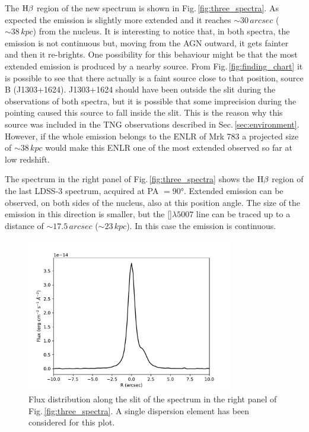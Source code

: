 \documentclass[../main.tex]{subfiles}
\begin{document}
The $\rm H\beta$ region of the new spectrum is shown in Fig.\,\ref{fig:three_spectra}.
As expected the emission is slightly more extended and it reaches $\sim 30\,\si{arcsec}$ ($\sim 38\,\si{kpc}$) from the nucleus.
It is interesting to notice that, in both spectra, the emission is not continuous but, moving from the AGN outward, it gets fainter and then it re-brights.
One possibility for this behaviour might be that the most extended emission is produced by a nearby source.
From Fig.\,\ref{fig:finding_chart} it is possible to see that there actually is a faint source close to that position, source B (J1303+1624).
J1303+1624 should have been outside the slit during the observations of both spectra, but it is possible that some imprecision during the pointing caused this source to fall inside the slit.
This is the reason why this source was included in the TNG observations described in Sec.\,\ref{sec:environment}.
However, if the whole emission belongs to the ENLR of Mrk 783 a projected size of $\sim 38\,\si{kpc}$ would make this ENLR one of the most extended observed so far at low redshift.

The spectrum in the right panel of Fig.\,\ref{fig:three_spectra} shows the $\rm H\beta$ region of the last LDSS-3 spectrum, acquired at PA $=\ang{90}$.
Extended emission can be observed, on both sides of the nucleus, also at this position angle.
The size of the emission in this direction is smaller, but the []$\lambda5007$ line can be traced up to a distance of $\sim 17.5\,\si{arcsec}$ ($\sim 23\,\si{kpc}$).
In this case the emission is continuous.

\begin{figure}
\centering
\includegraphics[width=0.8\textwidth]{images/paper3/Radial_distr.pdf} 
\caption[]{Flux distribution along the slit of the spectrum in the right panel of Fig.\,\ref{fig:three_spectra}. A single dispersion element has been considered for this plot.}
\label{fig:flux_distr}
\end{figure}
\end{document}
